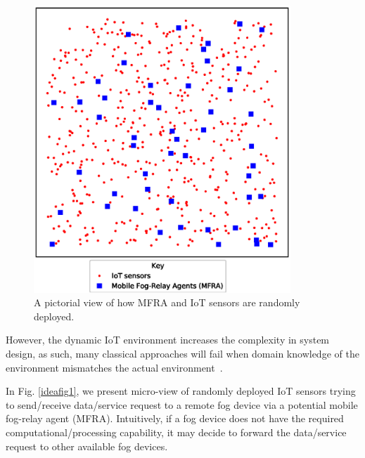 \documentclass[journal]{IEEEtran}
\begin{document}
\begin{figure}[!t]
\centering
\includegraphics[width=3.8in]{random_deploy.eps}
\caption{A pictorial view of how MFRA and IoT sensors are randomly deployed.}
\label{random_deploy}
\end{figure}


However, the dynamic IoT environment increases the complexity in system design, as such, many classical approaches will fail when domain knowledge of the environment mismatches the actual environment~\cite{Yau2012}.

 In Fig. \ref{ideafig1}, we present micro-view of randomly deployed IoT sensors trying to send/receive data/service request to a remote fog device via a potential mobile fog-relay agent (MFRA). Intuitively, if a fog device does not have the required computational/processing capability, it may decide to forward the data/service request to other available fog devices.
\end{document}
